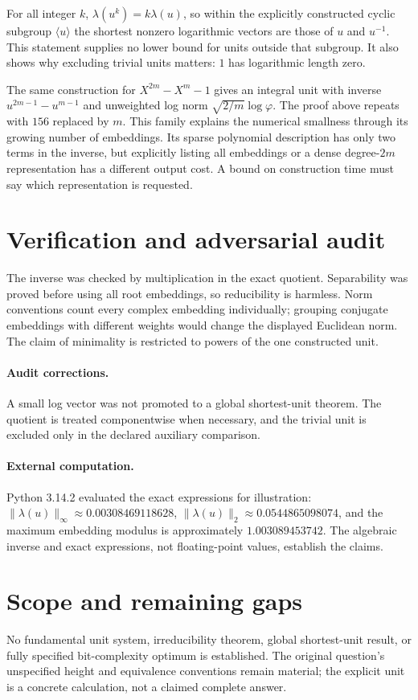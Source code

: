 \documentclass[11pt]{article}
\begin{document}
For all integer $k$, $\lambda(u^k)=k\lambda(u)$, so within the explicitly constructed cyclic subgroup $\langle u\rangle$ the shortest nonzero logarithmic vectors are those of $u$ and $u^{-1}$. This statement supplies no lower bound for units outside that subgroup. It also shows why excluding trivial units matters: $1$ has logarithmic length zero.

The same construction for $X^{2m}-X^m-1$ gives an integral unit with inverse $u^{2m-1}-u^{m-1}$ and unweighted log norm $\sqrt{2/m}\log\varphi$. The proof above repeats with $156$ replaced by $m$. This family explains the numerical smallness through its growing number of embeddings. Its sparse polynomial description has only two terms in the inverse, but explicitly listing all embeddings or a dense degree-$2m$ representation has a different output cost. A bound on construction time must say which representation is requested.
\section{Verification and adversarial audit}
The inverse was checked by multiplication in the exact quotient. Separability was proved before using all root embeddings, so reducibility is harmless. Norm conventions count every complex embedding individually; grouping conjugate embeddings with different weights would change the displayed Euclidean norm. The claim of minimality is restricted to powers of the one constructed unit.
\paragraph{Audit corrections.} A small log vector was not promoted to a global shortest-unit theorem. The quotient is treated componentwise when necessary, and the trivial unit is excluded only in the declared auxiliary comparison.
\paragraph{External computation.} Python 3.14.2 evaluated the exact expressions for illustration: $\|\lambda(u)\|_\infty\approx0.00308469118628$, $\|\lambda(u)\|_2\approx0.0544865098074$, and the maximum embedding modulus is approximately $1.003089453742$. The algebraic inverse and exact expressions, not floating-point values, establish the claims.
\section{Scope and remaining gaps}
No fundamental unit system, irreducibility theorem, global shortest-unit result, or fully specified bit-complexity optimum is established. The original question's unspecified height and equivalence conventions remain material; the explicit unit is a concrete calculation, not a claimed complete answer.
\end{document}
